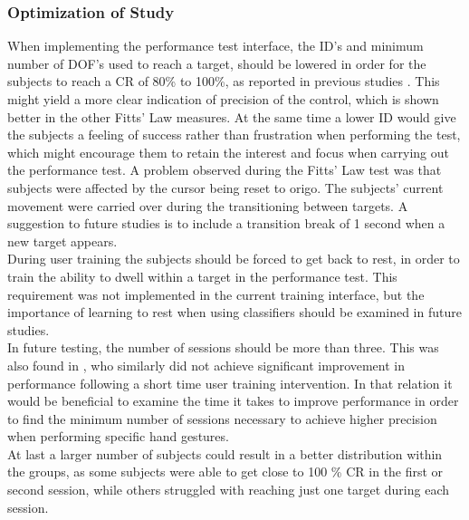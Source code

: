\subsubsection{Optimization of Study}
When implementing the performance test interface, the ID's and minimum number of DOF's used to reach a target, should be lowered in order for the subjects to reach a CR of 80\% to 100\%, as reported in previous studies \cite{Scheme2013, Scheme2013a}. This might yield a more clear indication of precision of the control, which is shown better in the other Fitts' Law measures. At the same time a lower ID would give the subjects a feeling of success rather than frustration when performing the test, which might encourage them to retain the interest and focus when carrying out the performance test.
A problem observed during the Fitts' Law test was that subjects were affected by the cursor being reset to origo. The subjects' current movement were carried over during the transitioning between targets. A suggestion to future studies is to include a transition break of 1 second when a new target appears. \\
During user training the subjects should be forced to get back to rest, in order to train the ability to dwell within a target in the performance test. This requirement was not implemented in the current training interface, but the importance of learning to rest when using classifiers should be examined in future studies.\\
In future testing, the number of sessions should be more than three. This was also found in \cite{Pan2017}, who similarly did not achieve significant improvement in performance following a short time user training intervention. In that relation it would be beneficial to examine the time it takes to improve performance in order to find the minimum number of sessions necessary to achieve higher precision when performing specific hand gestures. \\
At last a larger number of subjects could result in a better distribution within the groups, as some subjects were able to get close to 100 \% CR in the first or second session, while others struggled with reaching just one target during each session. 
